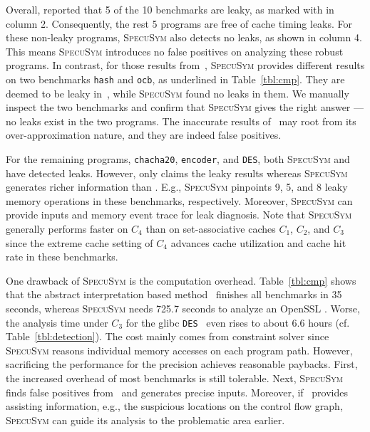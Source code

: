 \documentclass[sigconf]{acmart}
\newcommand{\SpecuSym}{\textsc{SpecuSym} }
\begin{document}
Overall, \cite{WuW19} reported that 5 of the 10 benchmarks are leaky, as marked 
with  in column 2. Consequently, the rest 5 programs are free of cache
timing leaks. For these non-leaky programs, \SpecuSym also detects no leaks, as 
shown in column 4. This means \SpecuSym introduces no false positives on analyzing 
these robust programs. In contrast, for those  results from~\cite{WuW19}, 
\SpecuSym provides different results on two benchmarks \texttt{hash} and \texttt{ocb}, 
as underlined in Table~\ref{tbl:cmp}. They are deemed to be leaky in~\cite{WuW19},
while \SpecuSym found no leaks in them. We manually inspect the two benchmarks and 
confirm that \SpecuSym gives the right answer --- no leaks exist in the two programs. 
The inaccurate results of~\cite{WuW19} may root from its over-approximation nature,
and they are indeed false positives.


For the remaining programs, \texttt{chacha20}, \texttt{encoder}, and \texttt{DES}, 
both \SpecuSym and~\cite{WuW19} have detected leaks. However, \cite{WuW19} only 
claims the leaky results whereas \SpecuSym generates richer information than
\cite{WuW19}. E.g., \SpecuSym pinpoints 9, 5, and 8 leaky memory operations in 
these benchmarks, respectively. Moreover, \SpecuSym can provide inputs and memory 
event trace for leak diagnosis. Note that \SpecuSym generally performs faster on 
$C_4$ than on set-associative caches $C_1$, $C_2$, and $C_3$ since the extreme cache 
setting of $C_4$ advances cache utilization and cache hit rate in these benchmarks. 


One drawback of \SpecuSym is the computation overhead. Table~\ref{tbl:cmp} shows 
that the abstract interpretation based method~\cite{WuW19} finishes all benchmarks 
in 35 seconds, whereas \SpecuSym needs 725.7 seconds to analyze an OpenSSL {}. 
Worse, the analysis time under $C_3$ for the glibc \texttt{DES}~\cite{glibc} even 
rises to about 6.6 hours (cf. Table~\ref{tbl:detection}). The cost mainly comes from 
constraint solver since \SpecuSym reasons individual memory accesses on each program 
path. However, sacrificing the performance for the precision achieves reasonable 
paybacks. First, the increased overhead of most benchmarks is still tolerable. Next, 
\SpecuSym finds false positives from~\cite{WuW19} and generates precise inputs. Moreover, 
if~\cite{WuW19} provides assisting information, e.g., the suspicious locations on the 
control flow graph, \SpecuSym can guide its analysis to the problematic area earlier. 
\end{document}

